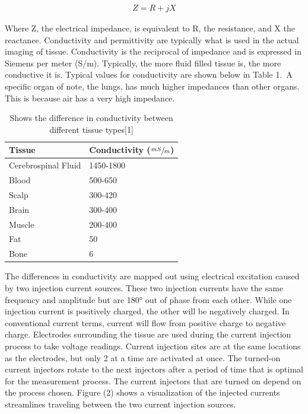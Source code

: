 \documentclass[12pt]{article}
\begin{document}
\begin{align}
    Z = R + jX
\end{align}

Where Z, the electrical impedance, is equivalent to R, the resistance,
and X the reactance. Conductivity and permittivity are typically what is
used in the actual imaging of tissue. Conductivity is the reciprocal of
impedance and is expressed in Siemens per meter (S/m). Typically, the
more fluid filled tissue is, the more conductive it is. Typical values
for conductivity are shown below in Table 1.~A specific organ of note,
the lungs, has much higher impedances than other organs. This is because
air has a very high impedance.

\begin{table}[h]
    \centering
    \caption{Shows the difference in conductivity between different tissue types{[}1{]}}
    \label{Table 1}
    \begin{tabular}{|l|l|}
    \hline
    \textbf{Tissue}     & \textbf{Conductivity ($\sfrac{mS}{m}$)} \\ \hline
    Cerebrospinal Fluid & 1450-1800                               \\ \hline
    Blood               & 500-650                                 \\ \hline
    Scalp               & 300-420                                 \\ \hline
    Brain               & 300-400                                 \\ \hline
    Muscle              & 200-400                                 \\ \hline
    Fat                 & 50                                      \\ \hline
    Bone                & 6                                       \\ \hline
    \end{tabular}
    
\end{table}

The differences in conductivity are mapped out using electrical
excitation caused by two injection current sources. These two injection
currents have the same frequency and amplitude but are 180° out of phase
from each other. While one injection current is positively charged, the
other will be negatively charged. In conventional current terms, current
will flow from positive charge to negative charge. Electrodes
surrounding the tissue are used during the current injection process to
take voltage readings. Current injection sites are at the same locations
as the electrodes, but only 2 at a time are activated at once. The
turned-on current injectors rotate to the next injectors after a period
of time that is optimal for the measurement process. The current
injectors that are turned on depend on the process chosen. Figure (2)
shows a visualization of the injected currents streamlines traveling
between the two current injection sources.
\end{document}
